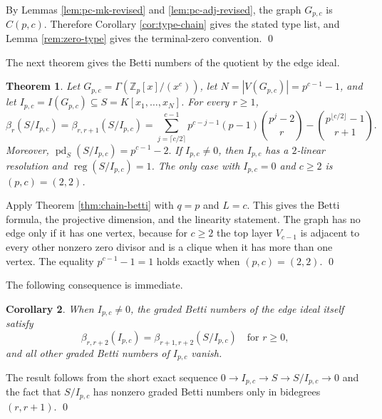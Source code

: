 \documentclass[12pt]{article}
\newtheorem{theorem}{Theorem}[section]
\newtheorem{corollary}[theorem]{Corollary}
\theoremstyle{definition}
\renewenvironment{proof}{{\bf \noindent Proof.}}{\qed}
\begin{document}
\begin{proof}
	By Lemmas \ref{lem:pc-mk-revised} and \ref{lem:pc-adj-revised}, the graph $G_{p,c}$ is $C(p,c)$.  Therefore Corollary \ref{cor:type-chain} gives the stated type list, and Lemma \ref{rem:zero-type} gives the terminal-zero convention.
\end{proof}

\medskip

The next theorem gives the Betti numbers of the quotient by the edge ideal.

\medskip

\begin{theorem}\label{thm:pc-betti-revised}
	Let $G_{p,c}=\Gamma(\mathbb{Z}_p[x]/(x^c))$, let $N=|V(G_{p,c})|=p^{c-1}-1$, and let $I_{p,c}=I(G_{p,c})\subseteq S=K[x_1,\ldots,x_N]$.  For every $r\geq 1$,
	$$
	\beta_r(S/I_{p,c})=\beta_{r,r+1}(S/I_{p,c})=
	\sum_{j=\lceil c/2\rceil}^{c-1}p^{c-j-1}(p-1)\binom{p^j-2}{r}
	-\binom{p^{\lfloor c/2\rfloor}-1}{r+1}.
	$$
	Moreover, 	$ 	\operatorname{pd}_S(S/I_{p,c})=p^{c-1}-2. $
	If $I_{p,c}\neq 0$, then $I_{p,c}$ has a $2$-linear resolution and $\operatorname{reg}(S/I_{p,c})=1$.  The only case with $I_{p,c}=0$ and $c\geq 2$ is $(p,c)=(2,2)$.
\end{theorem}

\begin{proof}
	Apply Theorem \ref{thm:chain-betti} with $q=p$ and $L=c$.  This gives the Betti formula, the projective dimension, and the linearity statement.  The graph has no edge only if it has one vertex, because for $c\geq 2$ the top layer $V_{c-1}$ is adjacent to every other nonzero zero divisor and is a clique when it has more than one vertex.  The equality $p^{c-1}-1=1$ holds exactly when $(p,c)=(2,2)$.
\end{proof}

\medskip

The following consequence is immediate.
\begin{corollary}\label{cor:pc-ideal-betti}
	When $I_{p,c}\neq 0$, the graded Betti numbers of the edge ideal itself satisfy
	$$
	\beta_{r,r+2}(I_{p,c})=\beta_{r+1,r+2}(S/I_{p,c})\quad\text{for }r\geq 0,
	$$
	and all other graded Betti numbers of $I_{p,c}$ vanish.
\end{corollary}

\begin{proof}
	The result follows from the short exact sequence $0\to I_{p,c}\to S\to S/I_{p,c}\to 0$ and the fact that $S/I_{p,c}$ has nonzero graded Betti numbers only in bidegrees $(r,r+1)$.
\end{proof}
\end{document}
